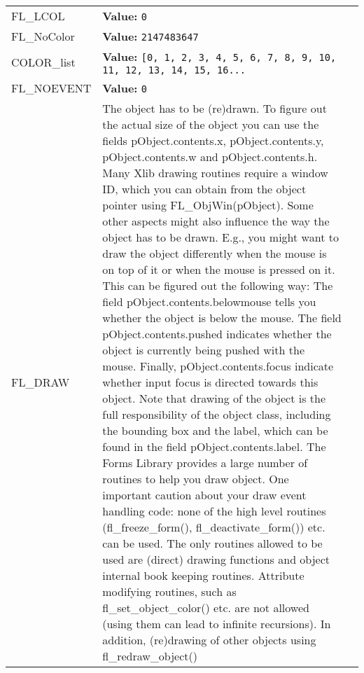 \begin{longtable}{|p{\varnamewidth}|p{\vardescrwidth}|l}
\cline{1-2}
\raggedright F\-L\-\_\-L\-C\-O\-L\- & \raggedright \textbf{Value:} 
{\tt 0}&\\
\cline{1-2}
\raggedright F\-L\-\_\-N\-o\-C\-o\-l\-o\-r\- & \raggedright \textbf{Value:} 
{\tt 2147483647}&\\
\cline{1-2}
\raggedright C\-O\-L\-O\-R\-\_\-l\-i\-s\-t\- & \raggedright \textbf{Value:} 
{\tt \texttt{[}0\texttt{, }1\texttt{, }2\texttt{, }3\texttt{, }4\texttt{, }5\texttt{, }6\texttt{, }7\texttt{, }8\texttt{, }9\texttt{, }10\texttt{, }11\texttt{, }12\texttt{, }13\texttt{, }14\texttt{, }15\texttt{, }16\texttt{...}}&\\
\cline{1-2}
\raggedright F\-L\-\_\-N\-O\-E\-V\-E\-N\-T\- & \raggedright \textbf{Value:} 
{\tt 0}&\\
\cline{1-2}
\raggedright F\-L\-\_\-D\-R\-A\-W\- & \raggedright The object has to be (re)drawn. To figure out the actual size of 
          the object you can use the fields pObject.contents.x, 
          pObject.contents.y, pObject.contents.w and pObject.contents.h. 
          Many Xlib drawing routines require a window ID, which you can 
          obtain from the object pointer using FL\_ObjWin(pObject). Some 
          other aspects might also influence the way the object has to be 
          drawn. E.g., you might want to draw the object differently when 
          the mouse is on top of it or when the mouse is pressed on it. 
          This can be figured out the following way: The field 
          pObject.contents.belowmouse tells you whether the object is below
          the mouse. The field pObject.contents.pushed indicates whether 
          the object is currently being pushed with the mouse. Finally, 
          pObject.contents.focus indicate whether input focus is directed 
          towards this object. Note that drawing of the object is the full 
          responsibility of the object class, including the bounding box 
          and the label, which can be found in the field 
          pObject.contents.label. The Forms Library provides a large number
          of routines to help you draw object. One important caution about 
          your draw event handling code: none of the high level routines 
          (fl\_freeze\_form(), fl\_deactivate\_form()) etc. can be used. 
          The only routines allowed to be used are (direct) drawing 
          functions and object internal book keeping routines. Attribute 
          modifying routines, such as fl\_set\_object\_color() etc. are not
          allowed (using them can lead to infinite recursions). In 
          addition, (re)drawing of other objects using fl\_redraw\_object()

\end{longtable}
